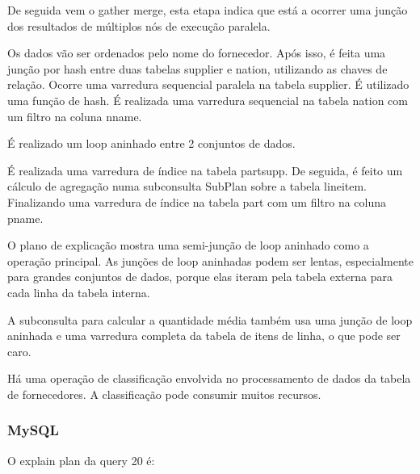 \documentclass{article}
\begin{document}
  De seguida vem o gather merge, esta etapa indica que está a ocorrer uma junção dos resultados de múltiplos nós de execução paralela.

  Os dados vão ser ordenados pelo nome do fornecedor. Após isso, é feita uma junção por hash entre duas tabelas supplier e nation, utilizando as chaves de relação. Ocorre uma varredura sequencial paralela na tabela supplier. É utilizado uma função de hash. É realizada uma varredura sequencial na tabela nation com um filtro na coluna n\underline{}name.

  É realizado um loop aninhado entre 2 conjuntos de dados.

  É realizada uma varredura de índice na tabela partsupp. De seguida, é feito um cálculo de agregação numa subconsulta SubPlan sobre a tabela lineitem. Finalizando uma varredura de índice na tabela part com um filtro na coluna p\underline{}name.


O plano de explicação mostra uma semi-junção de loop aninhado como a operação principal. As junções de loop aninhadas podem ser lentas, especialmente para grandes conjuntos de dados, porque elas iteram pela tabela externa para cada linha da tabela interna.

A subconsulta para calcular a quantidade média também usa uma junção de loop aninhada e uma varredura completa da tabela de itens de linha, o que pode ser caro.

Há uma operação de classificação envolvida no processamento de dados da tabela de fornecedores. A classificação pode consumir muitos recursos.

\subsubsection{MySQL}
O explain plan da query 20 é:\\
\end{document}
